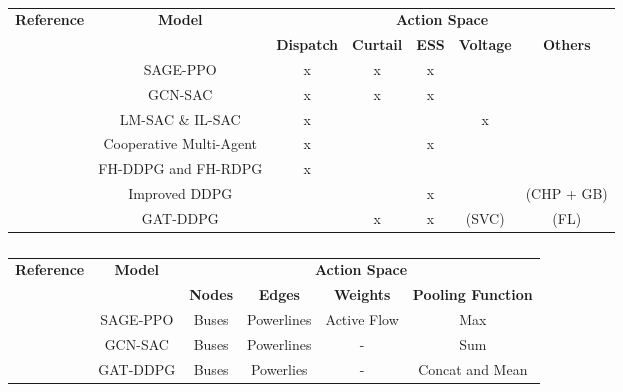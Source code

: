   \begin{table}[h!]
	\centering
	\caption{}
	\begin{tabular}{ccccccc}
		\toprule
		\multirow{2}{*}{\textbf{Reference}} & \multirow{2}{*}{\textbf{Model}} & \multicolumn{5}{c}{\textbf{Action Space}} \\ 
		\cmidrule(lr){3-7}
 		&  &  \textbf{Dispatch} & \textbf{Curtail} & \textbf{ESS} & \textbf{Voltage} & \textbf{Others} \\ 
		\midrule
		\cite{zhaoGraphbasedDeepReinforcement2022} & SAGE-PPO & x & x & x & & \\
		\cite{liNovelGraphReinforcement2022, chenScalableGraphReinforcement2023} & GCN-SAC & x & x & x & & \\
		\cite{hanAutonomousControlTechnology2023} & LM-SAC \& IL-SAC & x & & & x & \\
		\cite{liuDistributedEconomicDispatch2018} &  Cooperative Multi-Agent & x & & x & & \\
		\cite{leiDynamicEnergyDispatch2021} & FH-DDPG and FH-RDPG & x & & & & \\
		\cite{yangDynamicEnergyDispatch2021} & Improved DDPG & & & x & & (CHP + GB) \\
		\cite{xingRealtimeOptimalScheduling2023} & GAT-DDPG & & x & x & (SVC) & (FL) \\
		\bottomrule
	\end{tabular}
	\label{tab:ded-action}
\end{table}

  \begin{table}[h!]
	\centering
	\caption{}
	\begin{tabular}{cccccc}
		\toprule
		\multirow{2}{*}{\textbf{Reference}} & \multirow{2}{*}{\textbf{Model}} & \multicolumn{4}{c}{\textbf{Action Space}} \\ 
		\cmidrule(lr){3-6}
		&  &  \textbf{Nodes} & \textbf{Edges} & \textbf{Weights} & \textbf{Pooling Function}\\ 
		\midrule
		\cite{zhaoGraphbasedDeepReinforcement2022} & SAGE-PPO & Buses & Powerlines & Active Flow & Max \\
		\cite{liNovelGraphReinforcement2022, chenScalableGraphReinforcement2023} & GCN-SAC & Buses & Powerlines & - & Sum \\ 
		\cite{xingRealtimeOptimalScheduling2023} & GAT-DDPG & Buses & Powerlies & - & Concat and Mean \\
		\bottomrule
	\end{tabular}
	\label{tab:ded-action}
\end{table}

